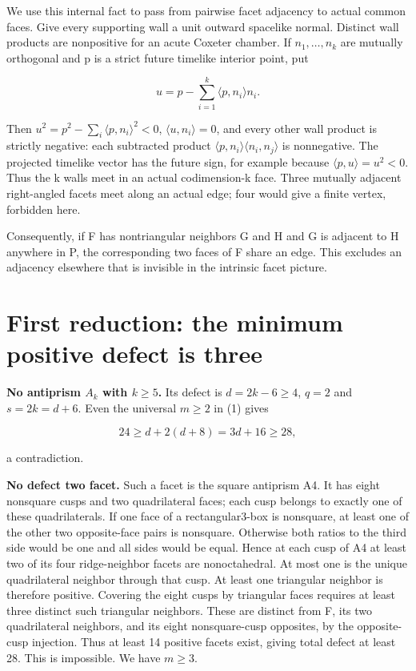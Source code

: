 \documentclass[11pt]{article}
\begin{document}
We use this internal fact to pass from pairwise facet adjacency to actual common faces. Give every supporting wall a unit outward spacelike normal. Distinct wall products are nonpositive for an acute Coxeter chamber. If \(n_1,\dots,n_k\) are mutually orthogonal and p is a strict future timelike interior point, put

\[
 u=p-\sum_{i=1}^k\langle p,n_i\rangle n_i.
\]

Then \(u^2=p^2-\sum_i\langle p,n_i\rangle^2<0\), \(\langle u,n_i\rangle=0\), and every other wall product is strictly negative: each subtracted product \(\langle p,n_i\rangle\langle n_i,n_j\rangle\) is nonnegative. The projected timelike vector has the future sign, for example because \(\langle p,u\rangle=u^2<0\). Thus the k walls meet in an actual codimension-k face. Three mutually adjacent right-angled facets meet along an actual edge; four would give a finite vertex, forbidden here.

Consequently, if F has nontriangular neighbors G and H and G is adjacent to H anywhere in P, the corresponding two faces of F share an edge. This excludes an adjacency elsewhere that is invisible in the intrinsic facet picture.

\section{First reduction: the minimum positive defect is three}\label{first-reduction-the-minimum-positive-defect-is-three}

\textbf{No antiprism \(A_k\) with \(k\ge5\).} Its defect is \(d=2k-6\ge4\), \(q=2\) and \(s=2k=d+6\). Even the universal \(m\ge2\) in (1) gives

\[
 24\ge d+2(d+8)=3d+16\ge28,
\]

a contradiction.

\textbf{No defect two facet.} Such a facet is the square antiprism A4. It has eight nonsquare cusps and two quadrilateral faces; each cusp belongs to exactly one of these quadrilaterals. If one face of a rectangular3-box is nonsquare, at least one of the other two opposite-face pairs is nonsquare. Otherwise both ratios to the third side would be one and all sides would be equal. Hence at each cusp of A4 at least two of its four ridge-neighbor facets are nonoctahedral. At most one is the unique quadrilateral neighbor through that cusp. At least one triangular neighbor is therefore positive. Covering the eight cusps by triangular faces requires at least three distinct such triangular neighbors. These are distinct from F, its two quadrilateral neighbors, and its eight nonsquare-cusp opposites, by the opposite-cusp injection. Thus at least 14 positive facets exist, giving total defect at least 28. This is impossible. We have \(m\ge3\).
\end{document}

